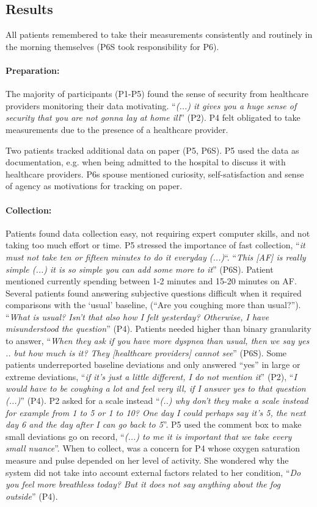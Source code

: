\subsection{Results}
All patients remembered to take their measurements consistently and routinely in the morning themselves (P6S took responsibility for P6). 

\paragraph{Preparation:} 
The majority of participants (P1-P5) found the sense of security from healthcare providers monitoring their data motivating. “\textit{(...) it gives you a huge sense of security that you are not gonna lay at home ill}” (P2). P4 felt obligated to take measurements due to the presence of a healthcare provider. 

Two patients tracked additional data on paper (P5, P6S). P5 used the data as documentation, e.g. when being admitted to the hospital to discuss it with healthcare providers. P6s spouse mentioned curiosity, self-satisfaction and sense of agency as motivations for tracking on paper. 

\paragraph{Collection:} 
Patients found data collection easy, not requiring expert computer skills, and not taking too much effort or time. P5 stressed the importance of fast collection, “\textit{it must not take ten or fifteen minutes to do it everyday (...)}“. “\textit{This [AF] is really simple (...) it is so simple you can add some more to it}” (P6S). Patient mentioned currently spending between 1-2 minutes and 15-20 minutes on AF. Several patients found answering subjective questions difficult when it required comparisons with the ‘usual’ baseline, (“Are you coughing more than usual?”). “\textit{What is usual? Isn’t that also how I felt yesterday? Otherwise, I have misunderstood the question}” (P4). Patients needed higher than binary granularity to answer, “\textit{When they ask if you have more dyspnea than usual, then we say yes .. but how much is it? They [healthcare providers] cannot see}” (P6S). Some patients underreported baseline deviations and only answered “yes” in large or extreme deviations, “\textit{if it’s just a little different, I do not mention it}” (P2),  “\textit {I would have to be coughing a lot and feel very ill, if I answer yes to that question (...)}” (P4). P2 asked for a scale instead “\textit{(..) why don’t they make a scale instead for example from 1 to 5 or 1 to 10? One day I could perhaps say it’s 5, the next day 6 and the day after I can go back to 5}”. P5 used the comment box to make small deviations go on record, “\textit{(...) to me it is important that we take every small nuance}”.  When to collect, was a concern for P4 whose oxygen saturation measure and pulse depended on her level of activity. She wondered why the system did not take into account external factors related to her condition, “\textit{Do you feel more breathless today? But it does not say anything about the fog outside}” (P4). 

